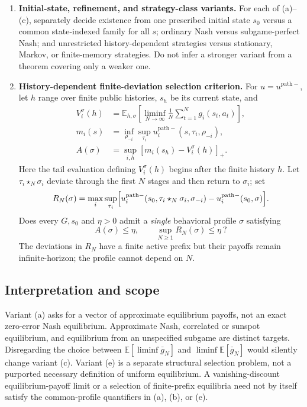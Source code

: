 \documentclass[11pt,a4paper]{article}
\newcommand{\E}{\mathbb E}
\begin{document}
\begin{enumerate}[label=\textbf{(\alph*)},leftmargin=2.5em]
	\item \textbf{Initial-state, refinement, and strategy-class variants.}
	For each of (a)--(c), separately decide existence from one prescribed
	initial state $s_0$ versus a common state-indexed family for all $s$;
	ordinary Nash versus subgame-perfect Nash; and unrestricted
	history-dependent strategies versus stationary, Markov, or finite-memory
	strategies. Do not infer a stronger variant from a theorem covering only
	a weaker one.
	
	\item \textbf{History-dependent finite-deviation selection criterion.}
	For $u=u^{\mathrm{path}-}$, let $h$ range over finite public histories,
	$s_h$ be its current state, and
	\[
	\begin{aligned}
		V_i^\sigma(h)&=\E_{h,\sigma}
		\left[\liminf_{N\to\infty}\frac1N\sum_{t=1}^{N}g_i(s_t,a_t)\right],\\
		m_i(s)&=\inf_{\rho_{-i}}\sup_{\tau_i}
		u_i^{\mathrm{path}-}(s,\tau_i,\rho_{-i}),\\
		A(\sigma)&=\sup_{i,h}[m_i(s_h)-V_i^\sigma(h)]_+.
	\end{aligned}
	\]
	Here the tail evaluation defining $V_i^\sigma(h)$ begins after the
	finite history $h$. Let $\tau_i\star_N\sigma_i$ deviate through the
	first $N$ stages and then return to $\sigma_i$; set
	\[
	R_N(\sigma)=\max_i\sup_{\tau_i}
	\Bigl[u_i^{\mathrm{path}-}(s_0,
	\tau_i\star_N\sigma_i,\sigma_{-i})
	-u_i^{\mathrm{path}-}(s_0,\sigma)\Bigr].
	\]
	Does every $G,s_0$ and $\eta>0$ admit a \emph{single} behavioral
	profile $\sigma$ satisfying
	\[
	\boxed{\quad A(\sigma)\le\eta,\qquad
		\sup_{N\ge1}R_N(\sigma)\le\eta\ ?\quad}
	\]
	The deviations in $R_N$ have a finite active prefix but their payoffs
	remain infinite-horizon; the profile cannot depend on $N$.
\end{enumerate}

\subsection*{Interpretation and scope}

Variant (a) asks for a vector of approximate equilibrium payoffs, not
an exact zero-error Nash equilibrium. Approximate Nash, correlated or
sunspot equilibrium, and equilibrium from an unspecified subgame are
distinct targets. Disregarding the choice between
$\E[\liminf\bar g_N]$ and $\liminf\E[\bar g_N]$ would silently change
variant (c). Variant (e) is a separate structural selection problem,
not a purported necessary definition of uniform equilibrium. A
vanishing-discount equilibrium-payoff limit or a selection of
finite-prefix equilibria need not by itself satisfy the common-profile
quantifiers in (a), (b), or (e).
\end{document}
